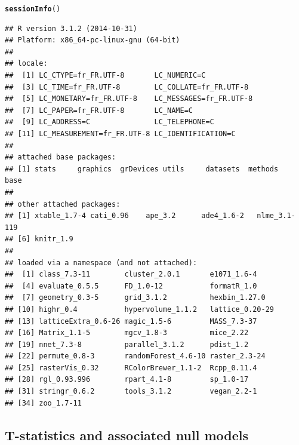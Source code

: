 \documentclass[12pt]{article}\usepackage[]{graphicx}\usepackage[]{color}
\makeatletter
\newcommand{\hlstd}[1]{\textcolor[rgb]{0.345,0.345,0.345}{#1}}%
\newcommand{\hlkwd}[1]{\textcolor[rgb]{0.737,0.353,0.396}{\textbf{#1}}}%
\newenvironment{kframe}{%
 \def\at@end@of@kframe{}%
 \ifinner\ifhmode%
  \def\at@end@of@kframe{\end{minipage}}%
  \begin{minipage}{\columnwidth}%
 \fi\fi%
 \def\FrameCommand##1{\hskip\@totalleftmargin \hskip-\fboxsep
 \colorbox{shadecolor}{##1}\hskip-\fboxsep
     \hskip-\linewidth \hskip-\@totalleftmargin \hskip\columnwidth}%
 \MakeFramed {\advance\hsize-\width
   \@totalleftmargin\z@ \linewidth\hsize
   \@setminipage}}%
 {\par\unskip\endMakeFramed%
 \at@end@of@kframe}
\newenvironment{knitrout}{}{} %
\makeatother
\begin{document}
\begin{knitrout}\small
{}\color{fgcolor}\begin{kframe}
\begin{alltt}
\hlkwd{sessionInfo}\hlstd{()}
\end{alltt}
\begin{verbatim}
## R version 3.1.2 (2014-10-31)
## Platform: x86_64-pc-linux-gnu (64-bit)
## 
## locale:
##  [1] LC_CTYPE=fr_FR.UTF-8       LC_NUMERIC=C              
##  [3] LC_TIME=fr_FR.UTF-8        LC_COLLATE=fr_FR.UTF-8    
##  [5] LC_MONETARY=fr_FR.UTF-8    LC_MESSAGES=fr_FR.UTF-8   
##  [7] LC_PAPER=fr_FR.UTF-8       LC_NAME=C                 
##  [9] LC_ADDRESS=C               LC_TELEPHONE=C            
## [11] LC_MEASUREMENT=fr_FR.UTF-8 LC_IDENTIFICATION=C       
## 
## attached base packages:
## [1] stats     graphics  grDevices utils     datasets  methods   base     
## 
## other attached packages:
## [1] xtable_1.7-4 cati_0.96    ape_3.2      ade4_1.6-2   nlme_3.1-119
## [6] knitr_1.9   
## 
## loaded via a namespace (and not attached):
##  [1] class_7.3-11        cluster_2.0.1       e1071_1.6-4        
##  [4] evaluate_0.5.5      FD_1.0-12           formatR_1.0        
##  [7] geometry_0.3-5      grid_3.1.2          hexbin_1.27.0      
## [10] highr_0.4           hypervolume_1.1.2   lattice_0.20-29    
## [13] latticeExtra_0.6-26 magic_1.5-6         MASS_7.3-37        
## [16] Matrix_1.1-5        mgcv_1.8-3          mice_2.22          
## [19] nnet_7.3-8          parallel_3.1.2      pdist_1.2          
## [22] permute_0.8-3       randomForest_4.6-10 raster_2.3-24      
## [25] rasterVis_0.32      RColorBrewer_1.1-2  Rcpp_0.11.4        
## [28] rgl_0.93.996        rpart_4.1-8         sp_1.0-17          
## [31] stringr_0.6.2       tools_3.1.2         vegan_2.2-1        
## [34] zoo_1.7-11
\end{verbatim}
\end{kframe}
\end{knitrout}

  \subsection {T-statistics and associated null models}
  
\end{document}
